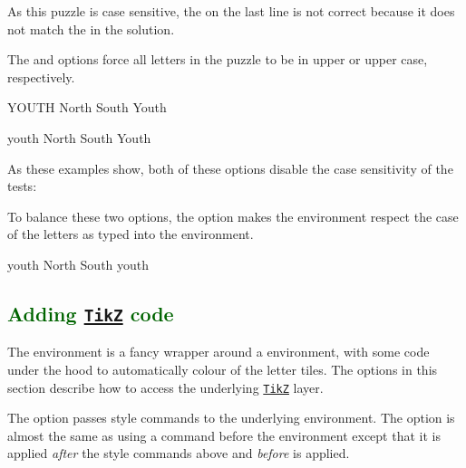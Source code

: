 \documentclass[svgnames]{report}
\newcommand\ctan[1]{\href{https://www.ctan.org/pkg/#1}{\texttt{#1}}}
\newcommand\Section[1]{\subsection{\textcolor{DarkGreen}{#1}}}
\begin{document}
  As this puzzle is case sensitive, the  on the last line
  is not correct because it does not match the  in the
  solution.

  The  and  options force all
  letters in the puzzle to be in upper or upper case, respectively.

  \begin{example}
    \begin{wordle}{YOUTH}
      North
      South
      Youth
    \end{wordle}
  \end{example}

  \begin{example}
    \begin{wordle}{youth}
      North
      South
      Youth
    \end{wordle}
  \end{example}

  As these examples show, both of these options disable the case sensitivity of the tests:

  To balance these two options, the  option makes
  the  environment respect the case of the letters as
  typed into the environment.

  \begin{example}
    \begin{wordle}{youth}
      North
      South
      youth
    \end{wordle}
  \end{example}

  \Section{Adding \ctan{TikZ} code}

  The  environment is a fancy wrapper around a
   environment, with some code under the hood
  to automatically colour of the letter tiles. The options in this
  section describe how to access the underlying \ctan{TikZ} layer.


  The  option passes style commands to the underlying
   environment. The  option is almost
  the same as using a \keyword{\tikzset{...}} command before the
   environment except that it is applied \textit{after}
  the style commands above and \textit{before}  is
  applied.
\end{document}
